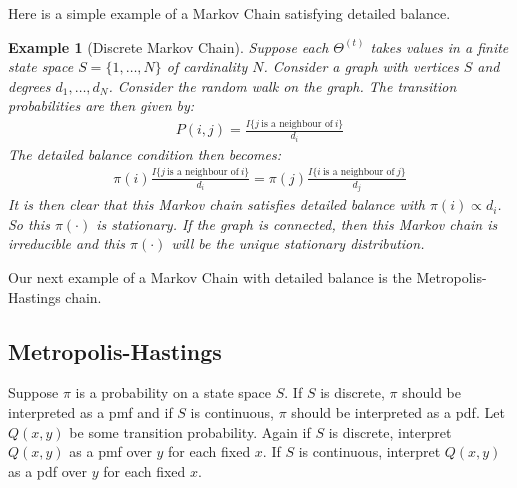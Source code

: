 \documentclass{scrartcl}
\newtheorem{example}[theorem]{Example}
\begin{document}
Here is a simple example of a Markov Chain satisfying detailed
balance.

\begin{example}[Discrete Markov Chain]
  Suppose each $\Theta^{(t)}$ takes values in a finite state space $S
  = \{1, \dots, N\}$ of cardinality $N$. Consider a graph with
  vertices $S$ and degrees $d_1, \dots, d_N$. Consider the random walk
  on the graph. The transition probabilities are then given by:
  \begin{align*}
    P(i, j) =  \frac{I\{j ~\text{is a neighbour of}~ i\}}{d_i}
  \end{align*}
  The detailed balance condition then becomes:
  \begin{align*}
    \pi(i)  \frac{I\{j ~\text{is a neighbour of}~ i\}}{d_i} = \pi(j)
    \frac{I\{i ~\text{is a neighbour of}~ j\}}{d_j}
  \end{align*}
  It is then clear that this Markov chain satisfies detailed balance
  with $\pi(i) \propto d_i$. So this $\pi(\cdot)$ is stationary. If
  the graph is connected, then this Markov chain is irreducible and
  this $\pi(\cdot)$ will be the unique stationary distribution. 
\end{example}

Our next example of a Markov Chain with detailed balance is the
Metropolis-Hastings chain.

\subsection{Metropolis-Hastings}

  Suppose $\pi$ is a probability on a state space $S$. If $S$ is
  discrete, $\pi$ should be interpreted as a pmf and if $S$ is
  continuous, $\pi$ should be interpreted as a pdf. Let $Q(x, y)$ be
  some transition probability. Again if $S$ is discrete, interpret
  $Q(x, y)$ as a pmf over $y$ for each fixed $x$. If $S$ is
  continuous, interpret $Q(x, y)$ as a pdf over $y$ for each fixed
  $x$.
\end{document}

